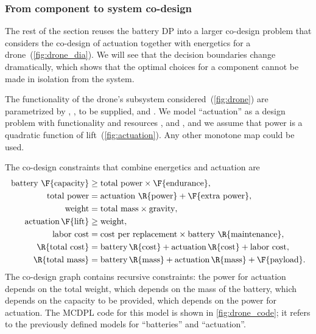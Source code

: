 \subsubsection{From component to system co-design}

The rest of the section reuses the battery DP into a larger co-design
problem that considers the co-design of actuation together with energetics
for a drone~(\cref{fig:drone_dia}). We will see that the decision
boundaries change dramatically, which shows that the optimal choices
for a component cannot be made in isolation from the system.

The functionality of the drone's subsystem considered~(\cref{fig:drone})
are parametrized by , ,  to be supplied, and . We model ``actuation''
as a design problem with functionality  and resources
,  and , and we assume that power is
a quadratic function of lift~(\cref{fig:actuation}). Any other monotone
map could be used.


\noindent The co-design constraints that combine energetics and actuation
are{\small{}
\begin{align}
\text{battery }\F{\text{capacity}} & \geq\text{total power}\times\F{\text{endurance}},\label{eq:drone_eq_first}\\
\text{total power} & =\text{actuation }\R{\text{power}}+\F{\text{extra power}},\nonumber \\
\text{weight} & =\text{total mass}\times\text{gravity},\nonumber \\
\text{actuation}\,\F{\text{lift}} & \geq\text{weight},\nonumber \\
\text{labor cost} & =\text{cost per replacement}\times\text{battery }\R{\text{maintenance}},\nonumber \\
\R{\text{total cost}} & =\text{battery}\,\R{\text{cost}}+\text{actuation}\,\R{\text{cost}}+\text{labor cost},\nonumber \\
\R{\text{total mass}} & =\text{battery}\,\R{\text{mass}}+\text{actuation}\,\R{\text{mass}}+\F{\text{payload}}.\label{eq:drone_eq_last}
\end{align}
}The co-design graph contains recursive constraints: the power for
actuation depends on the total weight, which depends on the mass of
the battery, which depends on the capacity to be provided, which depends
on the power for actuation. The MCDPL code  for this model is shown
in \cref{fig:drone_code}; it refers to the previously defined models
for ``batteries'' and ``actuation''.

